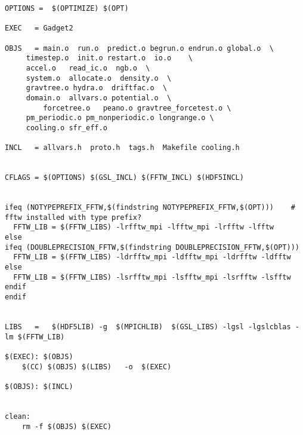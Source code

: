 \documentclass[a4paper,english,10.5pt]{scrartcl}
\begin{document}
\begin{verbatim}
OPTIONS =  $(OPTIMIZE) $(OPT)

EXEC   = Gadget2

OBJS   = main.o  run.o  predict.o begrun.o endrun.o global.o  \
	 timestep.o  init.o restart.o  io.o    \
	 accel.o   read_ic.o  ngb.o  \
	 system.o  allocate.o  density.o  \
	 gravtree.o hydra.o  driftfac.o  \
	 domain.o  allvars.o potential.o  \
         forcetree.o   peano.o gravtree_forcetest.o \
	 pm_periodic.o pm_nonperiodic.o longrange.o \
	 cooling.o sfr_eff.o

INCL   = allvars.h  proto.h  tags.h  Makefile cooling.h


CFLAGS = $(OPTIONS) $(GSL_INCL) $(FFTW_INCL) $(HDF5INCL)


ifeq (NOTYPEPREFIX_FFTW,$(findstring NOTYPEPREFIX_FFTW,$(OPT)))    # fftw installed with type prefix?
  FFTW_LIB = $(FFTW_LIBS) -lrfftw_mpi -lfftw_mpi -lrfftw -lfftw
else
ifeq (DOUBLEPRECISION_FFTW,$(findstring DOUBLEPRECISION_FFTW,$(OPT)))
  FFTW_LIB = $(FFTW_LIBS) -ldrfftw_mpi -ldfftw_mpi -ldrfftw -ldfftw
else
  FFTW_LIB = $(FFTW_LIBS) -lsrfftw_mpi -lsfftw_mpi -lsrfftw -lsfftw
endif
endif


LIBS   =   $(HDF5LIB) -g  $(MPICHLIB)  $(GSL_LIBS) -lgsl -lgslcblas -lm $(FFTW_LIB) 

$(EXEC): $(OBJS) 
	$(CC) $(OBJS) $(LIBS)   -o  $(EXEC)  

$(OBJS): $(INCL) 


clean:
	rm -f $(OBJS) $(EXEC)



\end{verbatim}
\end{document}
